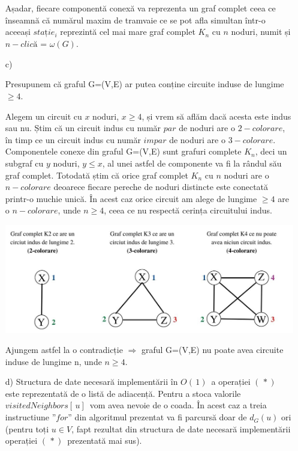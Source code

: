 \documentclass[12pt]{article}
\begin{document}
\begin{itemize}
Așadar, fiecare componentă conexă va reprezenta un graf complet ceea ce înseamnă că numărul maxim de tramvaie ce se pot afla simultan într-o aceeași $stație_i$ reprezintă cel mai mare graf complet $K_n$ cu $n$ noduri, numit și $n-clică$ = $ \omega (G)$.

  
  
    \item[c)]
    
    Presupunem că graful G=(V,E) ar putea conține circuite induse de lungime $ \geq 4 $.  
    
    Alegem un circuit cu $x$ noduri, $x \geq 4 $,  și vrem să aflăm dacă acesta este indus sau nu. Știm că un circuit indus cu număr $par$ de noduri are o $2-colorare$, în timp ce un circuit indus cu număr $impar$ de noduri are o $3-colorare$.  Componentele conexe din graful G=(V,E) sunt grafuri complete $K_n$, deci un subgraf cu $y$ noduri, $ y \leq x $, al unei astfel de componente va fi la rândul său graf complet. Totodată știm că orice graf complet $K_n$ cu $n$ noduri are o $n-colorare$ deoarece fiecare pereche de noduri distincte este conectată printr-o muchie unică. În acest caz orice circuit am alege de lungime $\geq 4 $ are o $n-colorare$, unde $n \geq 4$, ceea ce nu respectă cerința circuitului indus. 
    
    \includegraphics[scale=0.48]{Tema_1_c.jpg}
    
    Ajungem astfel la o contradicție $\Longrightarrow$ graful G=(V,E) nu poate avea circuite induse de lungime n, unde $ n \geq 4 $.

    
    \item[d)]
    Structura de date necesară implementării în $O ( \, 1 ) \,$ a operației $ ( \, * ) \,$ este reprezentată de o listă de adiacență. Pentru a stoca  valorile $visitedNeighbors [ \, u ] \,$ vom avea nevoie de o coada. În acest caz a treia instructiune $”for”$ din algoritmul prezentat va fi parcursă doar de $d_G(u)$ ori (pentru toți $u \in V$, fapt rezultat din structura de date necesară implementării operației $ ( \, * ) \,$ prezentată mai sus).
    

\end{itemize}
\end{document}
